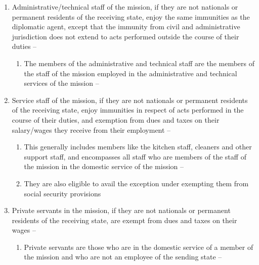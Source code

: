 \begin{enumerate}
\begin{enumerate}
        \item Administrative/technical staff of the mission, if they are not nationals or permanent residents of the receiving state, enjoy the same immunities as the diplomatic agent, except that the immunity from civil and administrative jurisdiction does not extend to acts performed outside the course of their duties -- 
        \begin{enumerate}
            \item The members of the administrative and technical staff are the members of the staff of the mission employed in the administrative and technical services of the mission -- 
        \end{enumerate}
        \item Service staff of the mission, if they are not nationals or permanent residents of the receiving state, enjoy immunities in respect of acts performed in the course of their duties, and exemption from dues and taxes on their salary/wages they receive from their employment -- 
        \begin{enumerate}
            \item This generally includes members like the kitchen staff, cleaners and other support staff, and encompasses all staff who are members of the staff of the mission in the domestic service of the mission -- 
            \item They are also eligible to avail the exception under  exempting them from social security provisions
        \end{enumerate}
        \item Private servants in the mission, if they are not nationals or permanent residents of the receiving state, are exempt from dues and taxes on their wages -- 
        \begin{enumerate}
            \item Private servants are those who are in the domestic service of a member of the mission and who are not an employee of the sending state -- 

\end{enumerate}
\end{enumerate}
\end{enumerate}
